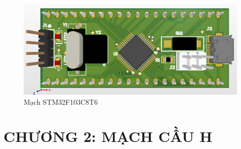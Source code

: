 \documentclass{article}
\begin{document}
\begin{figure}[H]
    \centering
    \includegraphics[width=1\textwidth]{image/pcb5.png}
    \caption{Mạch STM32F103C8T6}
    \label{fig:hbridge}
\end{figure}
\cleardoublepage
\section*{CHƯƠNG 2: MẠCH CẦU H}
\end{document}
